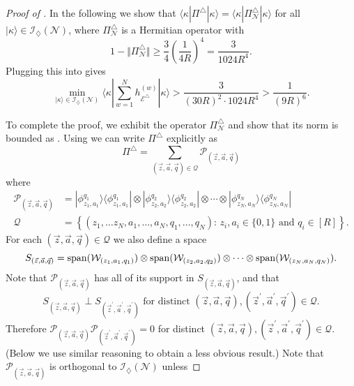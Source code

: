 \documentclass[../thesis-main/thesis-main]{subfiles}
\begin{document}
\begin{proof}[Proof of \protect{}]
In the following we show that $\langle\kappa|\Pi^{\triangle}|\kappa\rangle=\langle\kappa|\Pi_{\mathcal{N}}^{\triangle}|\kappa\rangle$ for all $|\kappa\rangle\in\mathcal{I}_{\diamondsuit}(\mathcal{N})$, where $\Pi_{\mathcal{N}}^{\triangle}$ is a Hermitian operator with
\begin{equation}
  1-\big\Vert \Pi_{\mathcal{N}}^{\triangle}\big\Vert \ge \frac{3}{4}\left(\frac{1}{4R}\right)^{4} = \frac{3}{1024R^4}.
  \label{eq:bound_norm_pi_triangle_n}
\end{equation}
Plugging this into  gives 
\[
\min_{|\kappa\rangle\in\mathcal{I}_{\diamondsuit}(\mathcal{N})}\langle\kappa|\sum_{w=1}^{N}h_{\mathcal{E}^{\triangle}}^{(w)}|\kappa\rangle>\frac{3}{(30R)^2 \cdot 1024R^4}>\frac{1}{(9R)^6}.
\]

To complete the proof, we exhibit the operator $\Pi_{\mathcal{N}}^{\triangle}$ and show that its norm is bounded as . Using  we can write $\Pi^{\triangle}$ explicitly as
\begin{equation}
\Pi^{\triangle}=\sum_{(\vec{z},\vec{a},\vec{q})\in\mathcal{Q}}\mathcal{P}_{(\vec{z},\vec{a},\vec{q})}\label{eq:Pi_N_triangle}
\end{equation}
where 
\begin{align*}
\mathcal{P}_{(\vec{z},\vec{a},\vec{q})} & =|\phi_{z_{1},a_{1}}^{q_{1}}\rangle\langle\phi_{z_{1},a_{1}}^{q_{1}}|\otimes|\phi_{z_{2},a_{2}}^{q_{2}}\rangle\langle\phi_{z_{2},a_{2}}^{q_{2}}|\otimes\cdots\otimes|\phi_{z_{N},a_{N}}^{q_{N}}\rangle\langle\phi_{z_{N},a_{N}}^{q_{N}}|\\
\mathcal{Q} & =\left\{ (z_{1},\ldots z_{N},a_{1},\ldots,a_{N},q_{1},\ldots,q_{N}):\, z_{i},a_{i}\in\{0,1\}\text{ and }q_{i}\in[R]\right\} .
\end{align*}
For each $(\vec{z},\vec{a},\vec{q})\in\mathcal{Q}$ we also define a space 
\[
S_{(\vec{z},\vec{a},\vec{q})}=\operatorname{span}(\mathcal{W}_{(z_{1},a_{1},q_{1})})\otimes\operatorname{span}(\mathcal{W}_{(z_{2},a_{2},q_{2})})\otimes\cdots\otimes\operatorname{span}(\mathcal{W}_{(z_{N},a_{N},q_{N})}).
\]
Note that $\mathcal{P}_{(\vec{z},\vec{a},\vec{q})}$ has all of its support in $S_{(\vec{z},\vec{a},\vec{q})}$, and that
\begin{equation}
S_{(\vec{z},\vec{a},\vec{q})}\perp S_{(\vec{z}^{\prime},\vec{a}^{\prime},\vec{q}^{\prime})}\text{ for distinct }(\vec{z},\vec{a},\vec{q}),(\vec{z}^{\prime},\vec{a}^{\prime},\vec{q}^{\prime})\in\mathcal{Q}.\label{eq:perp_S}
\end{equation}
Therefore $\mathcal{P}_{(\vec{z},\vec{a},\vec{q})}\mathcal{P}_{(\vec{z}^{\prime},\vec{a}^{\prime},\vec{q}^{\prime})}=0$ for distinct $(\vec{z},\vec{a},\vec{q}),(\vec{z}^{\prime},\vec{a}^{\prime},\vec{q}^{\prime})\in\mathcal{Q}$. (Below we use similar reasoning to obtain a less obvious result.) Note that $\mathcal{P}_{(\vec{z},\vec{a},\vec{q})}$ is orthogonal to $\mathcal{I}_{\diamondsuit}(\mathcal{N})$ unless 

\end{proof}
\end{document}
